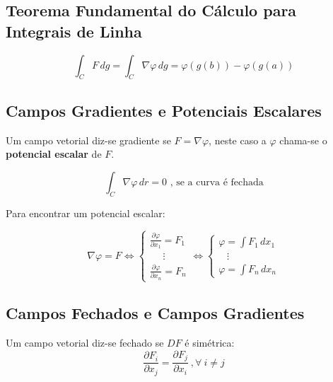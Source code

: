 \documentclass[11pt, a4paper]{article}
\begin{document}
\subsection{Teorema Fundamental do Cálculo para Integrais de Linha}

\begin{equation*}
    \int_{C} F \, dg =
    \int_{C} \nabla\varphi \, dg =
    \varphi\left(g(b)\right) - \varphi\left(g(a)\right)
\end{equation*}

\subsection{Campos Gradientes e Potenciais Escalares}

Um campo vetorial diz-se gradiente se $F = \nabla\varphi$, neste caso a $\varphi$
chama-se o \textbf{potencial escalar} de $F$.

\begin{equation*}
    \int_{C} \nabla\varphi \, dr = 0 \text{ , se a curva é fechada}
\end{equation*}

Para encontrar um potencial escalar:

\begin{equation*}
    \nabla\varphi = F \Leftrightarrow
    \begin{cases}
        \frac{\partial \varphi}{\partial x_1} = F_1 \\
        \ \ \ \ \ \ \vdots                          \\
        \frac{\partial \varphi}{\partial x_n} = F_n
    \end{cases} \Leftrightarrow
    \begin{cases}
        \varphi = \int F_1 \, dx_1 \\
        \ \ \ \, \vdots            \\
        \varphi = \int F_n \, dx_n
    \end{cases}
\end{equation*}

\subsection{Campos Fechados e Campos Gradientes}

Um campo vetorial diz-se fechado se $DF$ é simétrica:
\begin{equation*}
    \frac{\partial F_i}{\partial x_j} = \frac{\partial F_j}{\partial x_i}
    \ , \forall \  i \neq j
\end{equation*}
\end{document}

